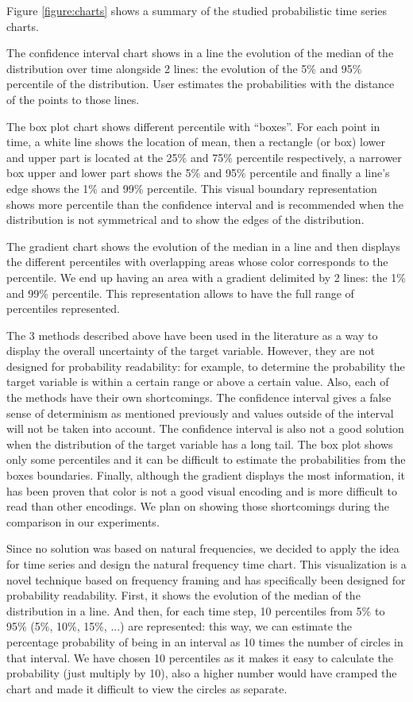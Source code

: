 \documentclass[a4paper,3p,sort&compress]{elsarticle}
\begin{document}
Figure \ref{figure:charts} shows a summary of the studied probabilistic time series charts.

The confidence interval chart shows in a line the evolution of the median of the distribution
 over time alongside 2 lines: the evolution of the 5\% and 95\% percentile of the distribution. 
 User estimates the probabilities with the distance of the points to those lines.

The box plot chart shows different percentile with “boxes”. For each point in time, a white 
line shows the location of mean, then a rectangle (or box) lower and upper part is located 
at the 25\% and 75\% percentile respectively, a narrower box upper and lower part shows 
the 5\% and 95\% percentile and finally a line’s edge shows the 1\% and 99\% percentile. 
This visual boundary representation shows more percentile than the confidence interval and 
is recommended when the distribution is not symmetrical and to show the edges of the distribution.

The gradient chart shows the evolution of the median in a line and then displays the different percentiles
with overlapping areas whose color corresponds to the percentile. We end up having an area with a gradient 
delimited by 2 lines: the 1\% and 99\% percentile. This representation allows to have the
 full range of percentiles represented.

The 3 methods described above have been used in the literature as a way to display the overall uncertainty 
of the target variable. However, they are not designed for probability readability: for example, to determine 
the probability the target variable is within a certain range or above a certain value. Also,
each of the methods have their own shortcomings. The confidence interval gives a false sense of determinism as mentioned previously
and values outside of the interval will not be taken into account. The confidence interval is also not a good solution 
when the distribution of the target variable has a long tail. The box plot shows only some percentiles and it can be difficult to 
estimate the probabilities from the boxes boundaries. Finally, although the gradient displays the most information, it has been 
proven that color is not 
a good visual encoding and is more difficult to read than other encodings. We plan on showing those shortcomings during the comparison in our experiments.

Since no solution was based on natural frequencies, we decided to apply the idea for time series and design the natural frequency time chart.
This visualization is a novel technique based on frequency framing and has 
specifically been designed for probability readability. First, 
it shows the evolution of the median of the distribution in a line. And then, for each time 
step, 10 percentiles from 5\% to 95\% (5\%, 10\%, 15\%, ...) are represented: this way, we can estimate the percentage 
probability of being in an interval as 10 times the number of circles in that interval. 
We have chosen 10 percentiles as it makes it easy to calculate the probability (just multiply by 10), also a higher number
would have cramped the chart and made it difficult to view the circles as separate. 
\end{document}
